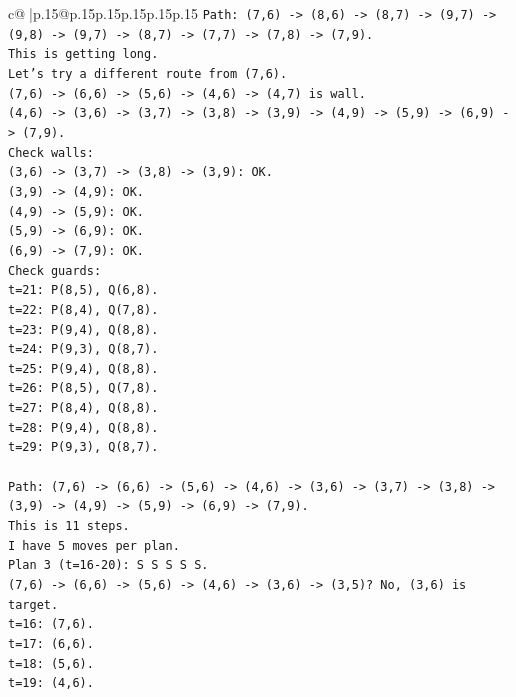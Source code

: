 \documentclass{article}
\begin{document}
{\begin{supertabular}{c@{$\;$}|p{.15\linewidth}@{}p{.15\linewidth}p{.15\linewidth}p{.15\linewidth}p{.15\linewidth}p{.15\linewidth}}
{{{\texttt{Path: (7,6) {-}> (8,6) {-}> (8,7) {-}> (9,7) {-}> (9,8) {-}> (9,7) {-}> (8,7) {-}> (7,7) {-}> (7,8) {-}> (7,9).} \\
\texttt{This is getting long.} \\
\texttt{Let's try a different route from (7,6).} \\
\texttt{(7,6) {-}> (6,6) {-}> (5,6) {-}> (4,6) {-}> (4,7) is wall.} \\
\texttt{(4,6) {-}> (3,6) {-}> (3,7) {-}> (3,8) {-}> (3,9) {-}> (4,9) {-}> (5,9) {-}> (6,9) {-}> (7,9).} \\
\texttt{Check walls:} \\
\texttt{(3,6) {-}> (3,7) {-}> (3,8) {-}> (3,9): OK.} \\
\texttt{(3,9) {-}> (4,9): OK.} \\
\texttt{(4,9) {-}> (5,9): OK.} \\
\texttt{(5,9) {-}> (6,9): OK.} \\
\texttt{(6,9) {-}> (7,9): OK.} \\
\texttt{Check guards:} \\
\texttt{t=21: P(8,5), Q(6,8).} \\
\texttt{t=22: P(8,4), Q(7,8).} \\
\texttt{t=23: P(9,4), Q(8,8).} \\
\texttt{t=24: P(9,3), Q(8,7).} \\
\texttt{t=25: P(9,4), Q(8,8).} \\
\texttt{t=26: P(8,5), Q(7,8).} \\
\texttt{t=27: P(8,4), Q(8,8).} \\
\texttt{t=28: P(9,4), Q(8,8).} \\
\texttt{t=29: P(9,3), Q(8,7).} \\
\\ 
\texttt{Path: (7,6) {-}> (6,6) {-}> (5,6) {-}> (4,6) {-}> (3,6) {-}> (3,7) {-}> (3,8) {-}> (3,9) {-}> (4,9) {-}> (5,9) {-}> (6,9) {-}> (7,9).} \\
\texttt{This is 11 steps.} \\
\texttt{I have 5 moves per plan.} \\
\texttt{Plan 3 (t=16{-}20): S S S S S.} \\
\texttt{(7,6) {-}> (6,6) {-}> (5,6) {-}> (4,6) {-}> (3,6) {-}> (3,5)? No, (3,6) is target.} \\
\texttt{t=16: (7,6).} \\
\texttt{t=17: (6,6).} \\
\texttt{t=18: (5,6).} \\
\texttt{t=19: (4,6).} \\
}}}
\end{supertabular}}
\end{document}
